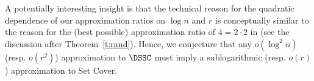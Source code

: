 A potentially interesting insight %
is that the technical reason for the quadratic dependence of our approximation ratios on $\log n$ and $r$ is conceptually similar to the reason for the (best possible) approximation ratio of $4 = 2\cdot 2$ in \cite{FLT04} (see the discussion after Theorem~\ref{t:rand}). Hence, we conjecture that any $o(\log^2 n)$ (resp. $o(r^2)$) approximation to $\DSSC$ must imply a sublogarithmic (resp. $o(r)$) approximation to Set Cover.%

